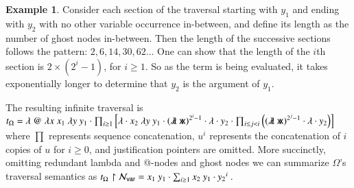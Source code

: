\documentclass{elsarticle}
\newif\iflongversion
\theoremstyle{plain}
\theoremstyle{definition}
\newtheorem{example}{Example}[section]
\newcommand\Nodes{\mathcal{N}}%
\newcommand\NodesVar{\Nodes_{\sf var}}%
\newcommand{\ghostlmd}{{\lambda\mkern-7mu \lambda}}
\newcommand{\ghostvar}{\mathsf{x\mkern-5mu x}}
\newcommand\ExtendedNodesVar{\tilde{\Nodes}_{\sf var}}
\begin{document}
\begin{example}
    Consider each section of the traversal starting with $y_1$ and ending with $y_2$ with no other variable occurrence in-between, and define its length as the number of ghost nodes in-between. Then the length of the successive sections follows the pattern: $2,6,14,30,62\ldots$
    One can show that the length of the $i$th section is $2\times(2^i-1)$, for $i\geq1$.
    So as the term is being evaluated, it takes exponentially longer to determine that $y_2$ is the argument of $y_1$.
\iflongversion
    The resulting infinite traversal is expressed as follows:
    \begin{equation*}
    t_\Omega = \lambda ~ @ ~ \lambda x ~  x_1 ~ \lambda y ~ y_1
    \cdot  \sum_{i\geq 1}
        \left[
            \lambda \cdot x_2 ~ \lambda y ~ y_1 \cdot
             {(\ghostlmd\ \ghostvar)}^{2^i -1}\cdot \lambda \cdot y_2
                 \cdot \sum_{i\leq j<i}
                    \left(
                        {(\ghostlmd\ \ghostvar)}^{2^j -1}
                        \cdot
                        \lambda \cdot y_2
                    \right)
        \right]
    \end{equation*}
    where $\prod$ represents sequence concatenation and $u^i$ represents the concatenation of $i$ copies of $u$ for $i\geq 0$, and justification pointers are omitted.

    More succinctly, omitting redundant lambda and @-nodes to keep only variable nodes:
    $t_\Omega \filter \ExtendedNodesVar =  x_1 ~ y_1
        \cdot  \prod_{i\geq 1}
            \left[
                x_2 ~ y_1 \cdot
                 \ghostvar^{2^i -1}\cdot y_2 \cdot
                     \prod_{1\leq j <i} (\ghostvar^{2^j -1} \cdot y_2)
            \right]
    $.
    Without ghost nodes, we can thus summarize $\Omega$'s traversal semantics as
    $
        t_\Omega \filter \NodesVar =  x_1 ~ y_1
        \cdot  \prod_{i\geq 1} x_2 ~ y_1 \cdot {y_2}^i \ .
    $
\else
The resulting infinite traversal is
$t_\Omega = \lambda ~ @ ~ \lambda x ~  x_1 ~ \lambda y ~ y_1
\cdot  \prod_{i\geq 1}
    \left[
        \lambda \cdot x_2 ~ \lambda y ~ y_1 \cdot
         {(\ghostlmd\ \ghostvar)}^{2^i -1}\cdot \lambda \cdot y_2
             \cdot \prod_{i\leq j<i}
                \left(
                    {(\ghostlmd\ \ghostvar)}^{2^j -1}
                    \cdot
                    \lambda \cdot y_2
                \right)
    \right]
$
where $\prod$ represents sequence concatenation, $u^i$ represents the concatenation of $i$ copies of $u$ for $i\geq 0$, and justification pointers are omitted.
More succinctly, omitting redundant lambda and @-nodes and ghost nodes we can summarize $\Omega$'s traversal semantics as
$
    t_\Omega \filter \NodesVar =  x_1 ~ y_1
    \cdot  \sum_{i\geq 1} x_2 ~ y_1 \cdot {y_2}^i \ .
$
\fi
\end{example}
\end{document}
